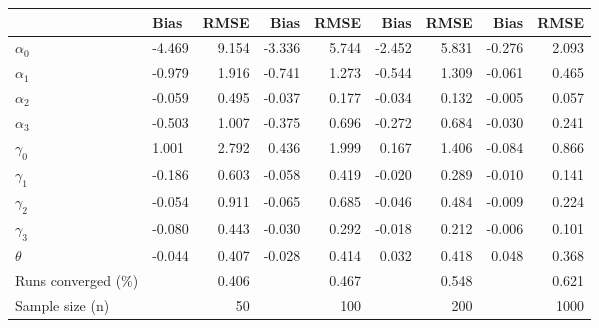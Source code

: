 
\begin{tabular}[t]{llrrrrrrr}
\toprule
  & Bias & RMSE & Bias & RMSE & Bias & RMSE & Bias & RMSE\\
\midrule
$\alpha_{0}$ & -4.469 & 9.154 & -3.336 & 5.744 & -2.452 & 5.831 & -0.276 & 2.093\\
$\alpha_{1}$ & -0.979 & 1.916 & -0.741 & 1.273 & -0.544 & 1.309 & -0.061 & 0.465\\
$\alpha_{2}$ & -0.059 & 0.495 & -0.037 & 0.177 & -0.034 & 0.132 & -0.005 & 0.057\\
$\alpha_{3}$ & -0.503 & 1.007 & -0.375 & 0.696 & -0.272 & 0.684 & -0.030 & 0.241\\
$\gamma_{0}$ & 1.001 & 2.792 & 0.436 & 1.999 & 0.167 & 1.406 & -0.084 & 0.866\\
$\gamma_{1}$ & -0.186 & 0.603 & -0.058 & 0.419 & -0.020 & 0.289 & -0.010 & 0.141\\
$\gamma_{2}$ & -0.054 & 0.911 & -0.065 & 0.685 & -0.046 & 0.484 & -0.009 & 0.224\\
$\gamma_{3}$ & -0.080 & 0.443 & -0.030 & 0.292 & -0.018 & 0.212 & -0.006 & 0.101\\
$\theta$ & -0.044 & 0.407 & -0.028 & 0.414 & 0.032 & 0.418 & 0.048 & 0.368\\
Runs converged (\%) &  & 0.406 &  & 0.467 &  & 0.548 &  & 0.621\\
Sample size (n) &  & 50 &  & 100 &  & 200 &  & 1000\\
\bottomrule
\end{tabular}
